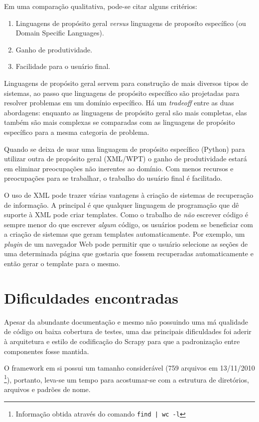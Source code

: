Em uma comparação qualitativa, pode-se citar alguns critérios:

\begin{enumerate}
	\item Linguagens de propósito geral \emph{versus} linguagens de proposíto específico (ou Domain Specific Languages).
	\item Ganho de produtividade.
	\item Facilidade para o usuário final.
\end{enumerate}

Linguagens de propósito geral servem para construção de mais diversos tipos de sistemas, ao passo que linguagens de propósito específico são projetadas para resolver problemas em um domínio específico. Há um \emph{tradeoff} entre as duas abordagens: enquanto as linguagens de propósito geral são mais completas, elas também são mais complexas se comparadas com as linguagens de propósito específico para a mesma categoria de problema.

Quando se deixa de usar uma linguagem de propósito específico (Python) para utilizar outra de propósito geral (XML/WPT) o ganho de produtividade estará em eliminar preocupações não inerentes ao domínio. Com menos recursos e preocupações para se trabalhar, o trabalho do usuário final é facilitado.

O uso de XML pode trazer várias vantagens à criação de sistemas de recuperação de informação. A principal é que qualquer linguagem de programação que dê suporte à XML pode criar templates. Como o trabalho de \emph{não} escrever código é sempre menor do que escrever \emph{algum} código, os usuários podem se beneficiar com a criação de sistemas que geram templates automaticamente. Por exemplo, um \emph{plugin} de um navegador Web pode permitir que o usuário selecione as seções de uma determinada página que gostaria que fossem recuperadas automaticamente e então gerar o template para o mesmo.

\pagebreak
\section{Dificuldades encontradas}

Apesar da abundante documentação e mesmo não possuindo uma má qualidade de código ou baixa cobertura de testes, uma das principais dificuldades foi aderir à arquitetura e estilo de codificação do Scrapy para que a padronização entre componentes fosse mantida.

O framework em si possui um tamanho considerável (759 arquivos em 13/11/2010 \footnote{Informação obtida através do comando \texttt{find | wc -l} }), portanto, leva-se um tempo para acostumar-se com a estrutura de diretórios, arquivos e padrões de nome.

